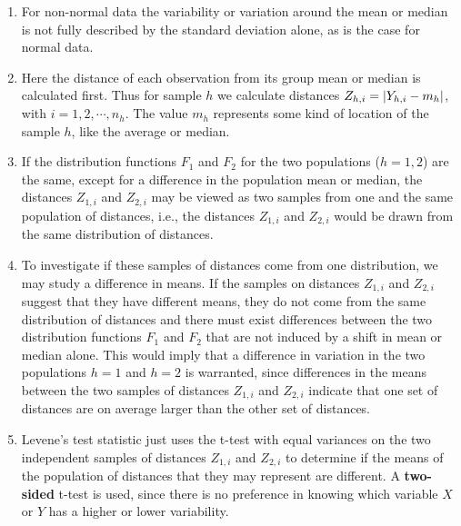 \begin{enumerate}
    \item For non-normal data the variability or variation around the mean or median is not fully described by the standard deviation alone, as is the case for normal data.
    \hfill \cite{statistics/book/Statistics-for-Data-Scientists/Maurits-Kaptein}

    \item Here the distance of each observation from its group mean or median is calculated first. 
    Thus for sample $h$ we calculate distances $Z_{ h,i} =\left| Y_{ h,i} - m_ h \right|$, with $i = 1, 2, \cdots , n_ h $. 
    The value $m_ h$ represents some kind of location of the sample $h$, like the average or median.
    \hfill \cite{statistics/book/Statistics-for-Data-Scientists/Maurits-Kaptein}

    \item If the distribution functions $F_1$ and $F_2$ for the two populations ($h = 1, 2$) are the same, except for a difference in the population mean or median, the distances $Z_{1,i}$ and $Z_{2,i}$ may be viewed as two samples from one and the same population of distances, i.e., the distances $Z_{1,i}$ and $Z_{2,i}$ would be drawn from the same distribution of distances. 
    \hfill \cite{statistics/book/Statistics-for-Data-Scientists/Maurits-Kaptein}

    \item To investigate if these samples of distances come from one distribution, we may study a difference in means. 
    If the samples on distances $Z_{1,i}$ and $Z_{2,i}$ suggest that they have different means, they do not come from the same distribution of distances and there must exist differences between the two distribution functions $F_1$ and $F_2$ that are not induced by a shift in mean or median alone. 
    This would imply that a difference in variation in the two populations $h = 1$ and $h = 2$ is warranted, since differences in the means between the two samples of distances $Z_{1,i}$ and $Z_{2,i}$ indicate that one set of distances are on average larger than the other set of distances.
    \hfill \cite{statistics/book/Statistics-for-Data-Scientists/Maurits-Kaptein}

    \item Levene’s test statistic just uses the t-test with equal variances on the two independent samples of distances $Z_{1,i}$ and $Z_{2,i}$ to determine if the means of the population of distances that they may represent are different.
    A \textbf{two-sided} t-test is used, since there is no preference in knowing which variable $X$ or $Y$ has a higher or lower variability.
    \hfill \cite{statistics/book/Statistics-for-Data-Scientists/Maurits-Kaptein}


\end{enumerate}
